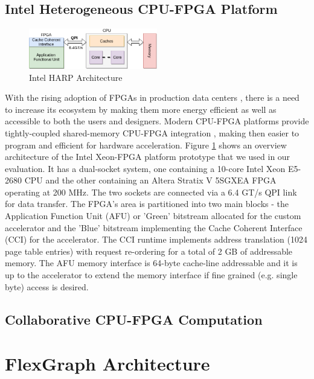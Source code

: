 \subsection{Intel Heterogeneous CPU-FPGA Platform}

\begin{figure}[htbp]
\centering
\includegraphics[width=0.5\textwidth]{figures/harp_arch}
\caption{Intel HARP Architecture}
\label{fig:harp_arch}
\end{figure}

With the rising adoption of FPGAs in production data centers \cite{Catapult}, there is a need to increase its ecosystem by making them more energy efficient as well as accessible to both the users and designers. Modern CPU-FPGA platforms \cite{CPU-FPGA} provide tightly-coupled shared-memory CPU-FPGA integration \cite{CAPI} \cite{CCI}, making then easier to program and efficient for hardware acceleration. Figure \ref{fig:harp_arch} shows an overview architecture of the Intel Xeon-FPGA platform prototype that we used in our evaluation. It has a dual-socket system, one containing a 10-core Intel Xeon E5-2680 CPU and the other containing an Altera Stratix V 5SGXEA FPGA operating at 200 MHz. The two sockets are connected via a 6.4 GT/s QPI \cite{QPI} link for data transfer. The FPGA's area is partitioned into two main blocks - the Application Function Unit (AFU) or 'Green' bitstream allocated for the custom accelerator and the 'Blue' bitstream implementing the Cache Coherent Interface (CCI) for the accelerator. The CCI runtime implements address translation (1024 page table entries) with request re-ordering for a total of 2 GB of addressable memory. The AFU memory interface is 64-byte cache-line addressable and it is up to the accelerator to extend the memory interface if fine grained (e.g. single byte) access is desired.

\subsection{Collaborative CPU-FPGA Computation}

\section{FlexGraph Architecture}

